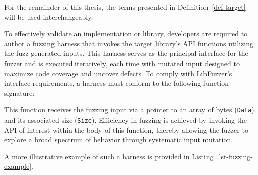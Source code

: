 \documentclass[
  a4paper,
  DIV=11,
  numbers=noendperiod]{scrreprt}
\newenvironment{Shaded}{\begin{snugshade}}{\end{snugshade}}
\newcommand{\ControlFlowTok}[1]{\textcolor[rgb]{0.85,0.12,0.09}{#1}}
\newcommand{\DataTypeTok}[1]{\textcolor[rgb]{0.47,0.16,0.63}{#1}}
\newcommand{\DecValTok}[1]{\textcolor[rgb]{0.47,0.16,0.63}{#1}}
\newcommand{\NormalTok}[1]{\textcolor[rgb]{0.33,0.33,0.33}{#1}}
\newcommand{\OperatorTok}[1]{\textcolor[rgb]{0.00,0.46,0.62}{#1}}
\theoremstyle{definition}
\theoremstyle{remark}
\begin{document}
For the remainder of this thesis, the terms presented in
Definition~\ref{def-target} will be used interchangeably.

To effectively validate an implementation or library, developers are
required to author a fuzzing harness that invokes the target library's
API functions utilizing the fuzz-generated inputs. This harness serves
as the principal interface for the fuzzer and is executed iteratively,
each time with mutated input designed to maximize code coverage and
uncover defects. To comply with LibFuzzer's interface requirements, a
harness must conform to the following function signature:

\begin{codelisting}

\caption[Fuzzing harness format]{\label{lst-basic-example}This function
receives the fuzzing input via a pointer to an array of bytes
(\texttt{Data}) and its associated size (\texttt{Size}). Efficiency in
fuzzing is achieved by invoking the API of interest within the body of
this function, thereby allowing the fuzzer to explore a broad spectrum
of behavior through systematic input mutation.}

\centering{

\begin{Shaded}
\begin{Highlighting}[numbers=left,,]
\DataTypeTok{int}\NormalTok{ LLVMFuzzerTestOneInput}\OperatorTok{(}\DataTypeTok{const} \DataTypeTok{uint8\_t} \OperatorTok{*}\NormalTok{Data}\OperatorTok{,} \DataTypeTok{size\_t}\NormalTok{ Size}\OperatorTok{)} \OperatorTok{\{}
\NormalTok{  DoSomethingInterestingWithData}\OperatorTok{(}\NormalTok{Data}\OperatorTok{,}\NormalTok{ Size}\OperatorTok{);}
  \ControlFlowTok{return} \DecValTok{0}\OperatorTok{;}
\OperatorTok{\}}
\end{Highlighting}
\end{Shaded}

}

\end{codelisting}%

A more illustrative example of such a harness is provided in
Listing~\ref{lst-fuzzing-example}.
\end{document}
